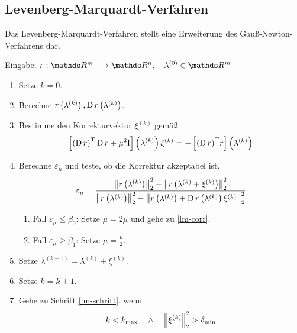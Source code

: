 
		\subsection{Levenberg-Marquardt-Verfahren} %
		\label{sub:levenberg_marquardt_verfahren}
		
			Das Levenberg-Marquardt-Verfahren stellt eine Erweiterung des Gauß-Newton-Verfahrens dar.


			\begin{tcolorbox}[colframe=black,colbacktitle=white,coltitle=black, attach boxed title to top center={yshift=-2mm},enhanced, titlerule=0.1pt, boxrule=0.5pt, breakable, arc=5pt,title=Algorithmus:\quad Levenberg-Marquardt-Verfahren]
				Eingabe: $r:\SR^m\longrightarrow\SR^n,\quad \lambda^{(0)}\in\SR^m$

				\begin{enumerate}[label=\normalfont (\arabic*)]
					\item Setze $k=0$.
					\item Berechne $r\left( \lambda^{(k)} \right), \operatorname{\mathrm{D}} r\left( \lambda^{(k)} \right)$.
					\label{lm-schritt}
					\item 
					\label{lm-corr}
					Bestimme den Korrekturvektor $\xi^{(k)}$ gemäß
						\[ \left[  {\left( \operatorname{\mathrm{D}} r \right)}^{\mathrm{T}}\operatorname{\mathrm{D}} r + \mu^2\mathrm{I}  \right]\left( \lambda^{(k)} \right) \xi^{(k)} = -\left[  {\left( \operatorname{\mathrm{D}} r \right)}^{\mathrm{T}}r  \right]\left( \lambda^{(k)} \right) \]
					\item Berechne $\varepsilon_\mu$ und teste, ob die Korrektur akzeptabel ist.
						\[ \varepsilon_\mu = \frac{ \left\| r\left( \lambda^{(k)} \right) \right\|^2_2 - \left\| r\left( \lambda^{(k)}+\xi^{(k)} \right) \right\|^2_2 }{ \left\| r\left( \lambda^{(k)} \right) \right\|^2_2 - \left\| r\left( \lambda^{(k)} \right) + \operatorname{\mathrm{D}} r\left( \lambda^{(k)} \right)\xi^{(k)} \right\|^2_2 } \]
						\begin{enumerate}[label=\normalfont (\roman*)]
							\item Fall $\varepsilon_\mu \leq \beta_0$: Setze $\mu = 2\mu$ und gehe zu \ref{lm-corr}.
							\item Fall $\varepsilon_\mu \geq \beta_1$: Setze $\mu = \frac{\mu}{2}$.
						\end{enumerate}
					\item Setze $\lambda^{(k+1)} = \lambda^{(k)} + \xi^{(k)}$.
					\item Setze $k=k+1$.
					\item Gehe zu Schritt \ref{lm-schritt}, wenn
						\[ k < k_{\mathrm{max}} \quad \wedge \quad \left\| \xi^{(k)} \right\|_2^2 > \delta_{\mathrm{min}} \]
				\end{enumerate}
			\end{tcolorbox}

